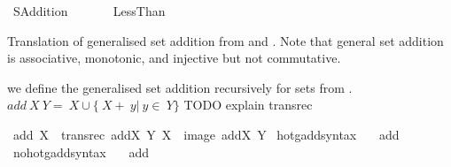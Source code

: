 %
\begin{isabellebody}%
%
%
\isadelimdocument
%
\endisadelimdocument
%
\isatagdocument
\isanewline
%
\isamarkuptrue%
%
\endisatagdocument
{\isafolddocument}%
%
\isadelimdocument
%
\endisadelimdocument
%
\isadelimtheory
%
\endisadelimtheory
%
\isatagtheory
{}\isamarkupfalse%
\ SAddition\isanewline
\ \ \isanewline
\ \ \ \ Less{\isacharunderscore}{\kern0pt}Than\isanewline
{}%
\endisatagtheory
{\isafoldtheory}%
%
\isadelimtheory
%
\endisadelimtheory
%
\isadelimdocument
%
\endisadelimdocument
%
\isatagdocument
%
\isamarkuptrue%
%
\endisatagdocument
{\isafolddocument}%
%
\isadelimdocument
%
\endisadelimdocument
%
\begin{isamarkuptext}%
Translation of generalised set addition from \cite{kirby_set_arithemtics}
and \cite{ZFC_in_HOL_AFP}. Note that general set addition is associative,
 monotonic, and injective but not commutative.%
\end{isamarkuptext}\isamarkuptrue%
%
\isadelimdocument
%
\endisadelimdocument
%
\isatagdocument
%
\isamarkuptrue%
%
\endisatagdocument
{\isafolddocument}%
%
\isadelimdocument
%
\endisadelimdocument
%
\begin{isamarkuptext}%
we define the generalised set addition recursively for sets from \cite{kirby_set_arithemtics}.
$add\ X\ Y =\ X \cup \{\ X +\ y |\ y \in\ Y\}$
TODO explain transrec%
\end{isamarkuptext}\isamarkuptrue%
\isamarkupfalse%
\ {\isachardoublequoteopen}add\ X\ {\isasymequiv}\ transrec\ {\isacharparenleft}{\kern0pt}{\isasymlambda}addX\ Y{\isachardot}{\kern0pt}\ X\ {\isasymunion}\ image\ addX\ Y{\isacharparenright}{\kern0pt}{\isachardoublequoteclose}\isanewline
\isanewline
{}\isamarkupfalse%
\ hotg{\isacharunderscore}{\kern0pt}add{\isacharunderscore}{\kern0pt}syntax\ \ \isamarkupfalse%
\ add\ {\isacharparenleft}{\kern0pt}\ {\isachardoublequoteopen}{\isacharplus}{\kern0pt}{\isachardoublequoteclose}\ {}{}{\isacharparenright}{\kern0pt}\ \isamarkupfalse%
\isanewline
{}\isamarkupfalse%
\ no{\isacharunderscore}{\kern0pt}hotg{\isacharunderscore}{\kern0pt}add{\isacharunderscore}{\kern0pt}syntax\ \ \isamarkupfalse%
\ add\ {\isacharparenleft}{\kern0pt}\ {\isachardoublequoteopen}{\isacharplus}{\kern0pt}{\isachardoublequoteclose}\ {}{}{\isacharparenright}{\kern0pt}\ \isamarkupfalse%

\end{isabellebody}
